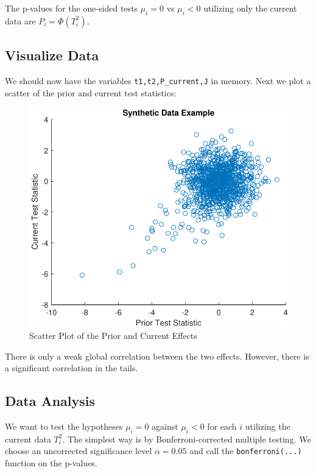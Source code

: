 \documentclass[english,11pt]{article} %
\begin{document}
The p-values for the one-sided tests $\mu_i = 0 $ vs $\mu_i <0$ utilizing only the current data are $P_i = \Phi(T^{2}_i)$.


\subsection{Visualize Data}

We should now have the variables \verb+t1,t2,P_current,J+ in memory. Next we plot a scatter of the prior and current test statistics:

\begin{figure}[ht!]
\centering
\includegraphics[scale=0.6]{"../Data/Synthetic_Data_example"}
\caption{Scatter Plot of the Prior and Current Effects}
\label{scatter_prior_current}
\end{figure}

There is only a weak global correlation between the two effects. However, there is a significant correlation in the tails. 


\subsection{Data Analysis}

We want to test the hypotheses $\mu_i = 0 $ against $\mu_i <0$ for each $i$ utilizing the current data $T^{2}_i$. The simplest way is by Bonferroni-corrected multiple testing. We choose an uncorrected significance level $\alpha=0.05$ and call the \verb+bonferroni(...)+ function on the p-values.
\end{document}
